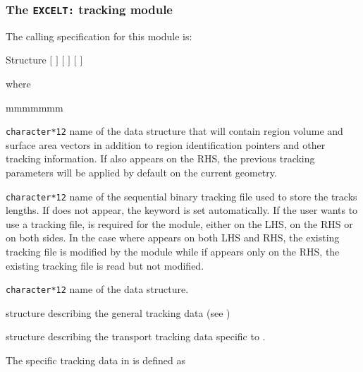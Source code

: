 \subsubsection{The {\tt EXCELT:} tracking module}\label{sect:EXCELLData}

The calling specification for this module is:

\begin{DataStructure}{Structure }
 $[$  $]$
\moc{:=}  $[$  $]$ $[$  $]$ 
 \moc{::}   
\end{DataStructure}

\noindent  where
\begin{ListeDeDescription}{mmmmmmm}

\item[\dusa{TRKNAM}] {\tt character*12} name of the  data
structure that will contain region volume and surface area vectors in
addition to region identification pointers and other tracking information.
If  also appears on the RHS, the previous tracking 
parameters will be applied by default on the current geometry.

\item[\dusa{TRKFIL}] {\tt character*12} name of the sequential binary tracking
file  used to store the tracks lengths. If  does not appear, the keyword
 is set automatically. If the user wants to use a tracking file,
 is required for the  module, either on the LHS, on the RHS or on both sides. In
the case where  appears on both LHS and RHS, the existing tracking
file is modified by the module while if  appears only on the RHS,
the existing tracking file is read but not modified.

\item[\dusa{GEONAM}] {\tt character*12} name of the  data
structure.

\item[\dstr{desctrack}] structure describing the general tracking data (see
)

\item[\dstr{descexcel}] structure describing the transport tracking data
specific to .

\end{ListeDeDescription}

\vskip 0.15cm

The  specific tracking data in  is defined as

